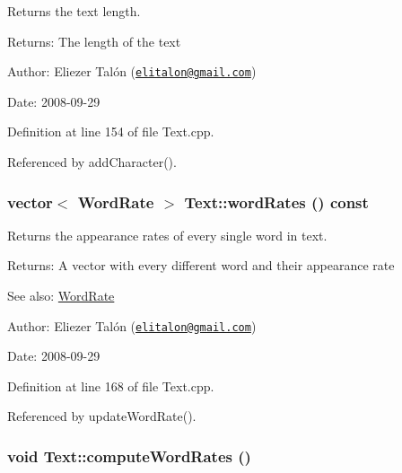 Returns the text length. 

\begin{Desc}
\item[Returns:]The length of the text\end{Desc}
\begin{Desc}
\item[Author:]Eliezer Talón (\href{mailto:elitalon@gmail.com}{\tt elitalon@gmail.com}) \end{Desc}
\begin{Desc}
\item[Date:]2008-09-29 \end{Desc}


Definition at line 154 of file Text.cpp.

Referenced by addCharacter().\hypertarget{class_text_1c69ff1b2a6b1bfbf0b44fc4a185de3d}{
\subsubsection[wordRates]{\setlength{\rightskip}{0pt plus 5cm}vector$<$ {\bf WordRate} $>$ Text::wordRates () const}}
\label{class_text_1c69ff1b2a6b1bfbf0b44fc4a185de3d}


Returns the appearance rates of every single word in text. 

\begin{Desc}
\item[Returns:]A vector with every different word and their appearance rate\end{Desc}
\begin{Desc}
\item[See also:]\hyperlink{_word_rate_8h_e8f43926daba5798edbb3cb94ad07ff7}{WordRate}\end{Desc}
\begin{Desc}
\item[Author:]Eliezer Talón (\href{mailto:elitalon@gmail.com}{\tt elitalon@gmail.com}) \end{Desc}
\begin{Desc}
\item[Date:]2008-09-29 \end{Desc}


Definition at line 168 of file Text.cpp.

Referenced by updateWordRate().\hypertarget{class_text_8239e13039bcc1c713f66f1236693706}{
\subsubsection[computeWordRates]{\setlength{\rightskip}{0pt plus 5cm}void Text::computeWordRates ()}}
\label{class_text_8239e13039bcc1c713f66f1236693706}


